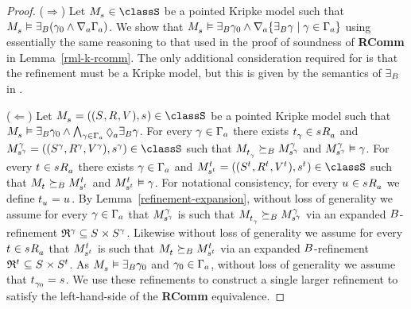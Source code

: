 \begin{proof}
($\Rightarrow$)
Let $\kPModel{\kStateS} \in \classS$ be a pointed Kripke model such that $\kPModel{\kStateS} \entails \somerefsBs (\gamma_0 \land \coversA \Gamma_\agentA)$.
We show that $\kPModel{\kStateS} \entails \somerefsBs \gamma_0 \land \coversA \{\somerefsBs \gamma \mid \gamma \in \Gamma_\agentA\}$ using essentially the same reasoning to that used in the proof of soundness of {\bf RComm} in Lemma~\ref{rml-k-rcomm}.
The only additional consideration required for \logicRmlS{} is that the refinement must be a \classS{} Kripke model, but this is given by the semantics of $\somerefsBs$ in \logicRmlS{}.

($\Leftarrow$)
Let $\kPModelAndTuple{\kStateS} \in \classS$ be a pointed Kripke model such that $\kPModel{\kStateS} \entails \somerefsBs \gamma_0 \land \bigwedge_{\gamma \in \Gamma_\agentA} \possibleA \somerefsBs \gamma$.
For every $\gamma \in \Gamma_\agentA$ there exists $\kStateT_\gamma \in \kSuccessorsA{\kStateS}$ and $\kPModelAndTuple[\gamma]{\kStateS[\gamma]} \in \classS$ such that $\kPModel{\kStateT_\gamma} \simulatesBs \kPModel[\gamma]{\kStateS[\gamma]}$ and $\kPModel[\gamma]{\kStateS[\gamma]} \entails \gamma$.
For every $\kStateT \in \kSuccessorsA{\kStateS}$ there exists $\gamma \in \Gamma_\agentA$ and $\kPModelAndTuple[\kStateT]{\kStateS[\kStateT]} \in \classS$ such that $\kPModel{\kStateT} \simulatesBs \kPModel[\kStateT]{\kStateS[\kStateT]}$ and $\kPModel[\kStateT]{\kStateS[\kStateT]} \entails \gamma$.
For notational consistency, for every $\kStateU \in \kSuccessorsA{\kStateS}$ we define $\kStateT_{\kStateU} = \kStateU$.
By Lemma~\ref{refinement-expansion}, without loss of generality we assume for every $\gamma \in \Gamma_\agentA$ that $\kPModel[\gamma]{\kStateS[\gamma]}$ is such that $\kPModel{\kStateT_\gamma} \simulatesBs \kPModel[\gamma]{\kStateS[\gamma]}$ via an expanded $\agentsB$-refinement $\refinement^{\gamma} \subseteq \kStates \times \kStates[\gamma]$.
Likewise without loss of generality we assume for every $\kStateT \in \kSuccessorsA{\kStateS}$ that $\kPModel[\kStateT]{\kStateS[\kStateT]}$ is such that $\kPModel{\kStateT} \simulatesBs \kPModel[\kStateT]{\kStateS[\kStateT]}$ via an expanded $\agentsB$-refinement $\refinement^{\kStateT} \subseteq \kStates \times \kStates[\kStateT]$.
As $\kPModel{\kStateS} \entails \somerefsBs \gamma_0$ and $\gamma_0 \in \Gamma_\agentA$, without loss of generality we assume that $\kStateT_{\gamma_0} = \kStateS$.
We use these refinements to construct a single larger refinement to satisfy the left-hand-side of the {\bf RComm} equivalence.


\end{proof}
